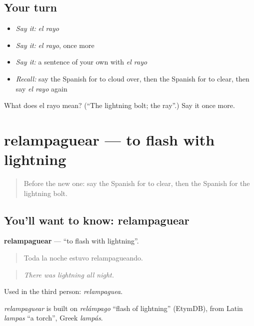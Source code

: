 \subsection*{Your turn}
\begin{itemize}
\raggedright
  \item \emph{Say it:} \emph{el rayo}
  \item \emph{Say it:} \emph{el rayo}, once more
  \item \emph{Say it:} a sentence of your own with \emph{el rayo}
  \item \emph{Recall:} say the Spanish for to cloud over, then the Spanish for to clear, then say \emph{el rayo} again
\end{itemize}

\begin{tcolorbox}[breakable,colback=teal!4,colframe=teal!35!black,title={Before you move on}]
What does el rayo mean? (\textquotedblleft{}The lightning bolt; the ray\textquotedblright{}.) Say it once more.
\end{tcolorbox}
\section[relampaguear]{relampaguear — to flash with lightning}

\label{lesson:ES-C699-relampaguear}



\begin{quote}
Before the new one: say the Spanish for to clear, then the Spanish for the lightning bolt.
\end{quote}

\subsection*{You'll want to know: relampaguear}
\textbf{relampaguear} — \textquotedblleft{}to flash with lightning\textquotedblright{}.

\begin{quote}
Toda la noche estuvo relampagueando.
\end{quote}

\begin{quote}
\emph{There was lightning all night.}
\end{quote}

Used in the third person: \emph{relampaguea}.

\begin{cousinweb}
\emph{relampaguear} is built on \emph{relámpago} \textquotedblleft{}flash of lightning\textquotedblright{} (EtymDB), from Latin \emph{lampas} \textquotedblleft{}a torch\textquotedblright{}, Greek \emph{lampás}.
\end{cousinweb}

